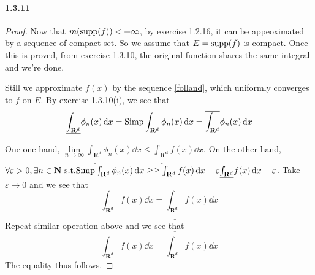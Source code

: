 \documentclass{article}
\begin{document}
\paragraph{1.3.11}
\begin{proof}
Now that $m(\mathrm{supp}(f))<+\infty$, by exercise 1.2.16, it can be appeoximated by a sequence of compact set. So we assume that $E=\mathrm{supp}(f)$ is compact. Once this is proved, from exercise 1.3.10, the original function shares the same integral and we're done.

Still we approximate $f(x)$ by the sequence \ref{folland}, which uniformly converges to $f$ on $E$. By exercise 1.3.10(i), we see that 
\[\underline{\int_{\mathbf{R}^d}}\phi_n(x)\,\mathrm{d} x=\mathrm{Simp}\int_{\mathbf{R}^d}\phi_n(x)\,\mathrm{d} x=\overline{\int_{\mathbf{R}^d}}\phi_n(x)\,\mathrm{d} x\]

One one hand, $\lim\limits_{n\to\infty}\underline{\int_{\mathbf{R}^d}}\phi_n(x)\dd x\leq\underline{\int_\mathbf{R^d}}f(x)\dd x$. On the other hand, $\forall \varepsilon>0,\exists n\in\mathbf{N}\text{ s.t.} \mathrm{Simp}\int_{\mathbf{R}^d}\phi_n(x)\,\mathrm{d} x\geq \geq\int_{\mathbf{R}^d}f(x)\,\mathrm{d} x-\varepsilon\underline{\int_{\mathbf{R}^d}}f(x)\,\mathrm{d} x-\varepsilon$. Take $\varepsilon\to 0$ and we see that 
\[\int_{\mathbf{R}^d}f(x)\dd x=\underline{\int_{\mathbf{R}^d}}f(x)\dd x\]
Repeat similar operation above and we see that 
\[\int_{\mathbf{R}^d}f(x)\dd x=\overline{\int_{\mathbf{R}^d}}f(x)\dd x\]
The equality thus follows.
\end{proof}
\end{document}
